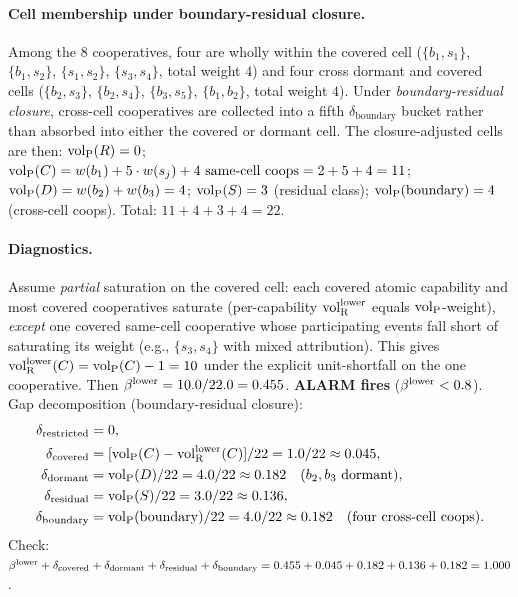 \paragraph{Cell membership under boundary-residual closure.}
Among the 8 cooperatives, four are wholly within the covered
cell ($\{b_1, s_1\}$, $\{b_1, s_2\}$, $\{s_1, s_2\}$,
$\{s_3, s_4\}$, total weight $4$) and four cross dormant and
covered cells ($\{b_2, s_3\}$, $\{b_2, s_4\}$, $\{b_3, s_5\}$,
$\{b_1, b_2\}$, total weight $4$).  Under
\emph{boundary-residual closure}, cross-cell cooperatives are
collected into a fifth $\delta_{\mathrm{boundary}}$ bucket
rather than absorbed into either the covered or dormant cell.
The closure-adjusted cells are then:
${\operatorname{vol}_{\mathrm{P}}}(R) = 0$;
${\operatorname{vol}_{\mathrm{P}}}(C) = w(b_1) + 5 \cdot w(s_j) + 4 \text{ same-cell coops}
= 2 + 5 + 4 = 11$;
${\operatorname{vol}_{\mathrm{P}}}(D) = w(b_2) + w(b_3) = 4$;
${\operatorname{vol}_{\mathrm{P}}}(S) = 3$ (residual class);
${\operatorname{vol}_{\mathrm{P}}}(\mathrm{boundary}) = 4$ (cross-cell coops).
Total: $11 + 4 + 3 + 4 = 22$.

\paragraph{Diagnostics.}
Assume \emph{partial} saturation on the covered cell: each
covered atomic capability and most covered cooperatives
saturate (per-capability ${\operatorname{vol}_{\mathrm{R}}^{\mathrm{lower}}}$ equals
${\operatorname{vol}_{\mathrm{P}}}$-weight), \emph{except} one covered same-cell
cooperative whose participating events fall short of
saturating its weight (e.g., $\{s_3, s_4\}$ with mixed
attribution).  This gives ${\operatorname{vol}_{\mathrm{R}}^{\mathrm{lower}}}(C) = {\operatorname{vol}_{\mathrm{P}}}(C) - 1 = 10$
under the explicit unit-shortfall on the one cooperative.  Then $\beta^{\mathrm{lower}} = 10.0 / 22.0 = 0.455$.
\textbf{ALARM fires} ($\beta^{\mathrm{lower}} < 0.8$).  Gap decomposition
(boundary-residual closure):
\begin{align*}
\delta_{\mathrm{restricted}} &= 0, \\
\delta_{\mathrm{covered}} &= [{\operatorname{vol}_{\mathrm{P}}}(C) - {\operatorname{vol}_{\mathrm{R}}^{\mathrm{lower}}}(C)]/22
  = 1.0/22 \approx 0.045, \\
\delta_{\mathrm{dormant}} &= {\operatorname{vol}_{\mathrm{P}}}(D)/22 = 4.0/22 \approx 0.182
  \quad \text{($b_2, b_3$ dormant)}, \\
\delta_{\mathrm{residual}} &= {\operatorname{vol}_{\mathrm{P}}}(S)/22 = 3.0/22 \approx 0.136, \\
\delta_{\mathrm{boundary}} &= {\operatorname{vol}_{\mathrm{P}}}(\mathrm{boundary})/22
  = 4.0/22 \approx 0.182 \quad \text{(four cross-cell coops)}. \\
\end{align*}
Check: $\beta^{\mathrm{lower}} + \delta_{\mathrm{covered}} +
\delta_{\mathrm{dormant}} + \delta_{\mathrm{residual}} +
\delta_{\mathrm{boundary}} = 0.455 + 0.045 + 0.182 + 0.136 +
0.182 = 1.000$.

